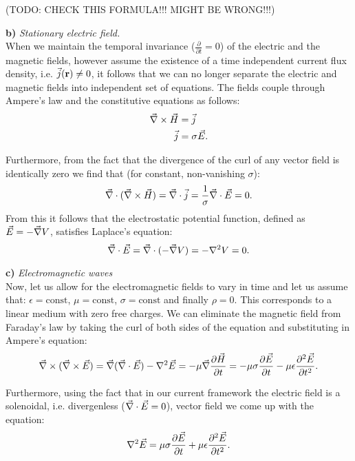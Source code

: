 \documentclass[10pt,a4paper]{report}
\def\Nabla{\ensuremath\vec{\nabla}}
\def\bm{\ensuremath\mathbf}
\def\curl{\ensuremath\Nabla\times}
\def\div{\ensuremath\Nabla\cdot}
\def\lap{\ensuremath\nabla^2}
\def\vlap{\ensuremath\nabla^2}
\begin{document}
(TODO: CHECK THIS FORMULA!!! MIGHT BE WRONG!!!)


\textbf{b)} \emph{Stationary electric field.} \\

When we maintain the temporal invariance ($\frac{\partial}{\partial t}=0$) of the electric and the magnetic fields, however assume the existence of a time independent current flux density, i.e. $\vec{j}(\bm{r}) \neq 0 $, it follows that we can no longer separate the electric and magnetic fields into independent set of equations. The fields couple through Ampere's law and the constitutive equations as follows:
\begin{align*}
  \curl \vec{H} &= \vec{j}\\
  \vec{j} &= \sigma \vec{E}. 
\end{align*}

Furthermore, from the fact that the divergence of the curl of any vector field is identically zero we find that (for constant, non-vanishing $\sigma$): 
\begin{equation*}
  \div (\curl \vec{H}) = \div \vec{j} = \frac{1}{\sigma}\div \vec{E} = 0. 
\end{equation*}
From this it follows that the electrostatic potential function, defined as $\vec{E}=-\Nabla V$, satisfies Laplace's equation:
\begin{equation*}
  \div \vec{E} = \div (-\Nabla V) = -\lap V = 0. 
\end{equation*}



\textbf{c)} \emph{Electromagnetic waves} \\
Now, let us allow for the electromagnetic fields to vary in time and let us assume that: $\epsilon = \text{const}$, $\mu = \text{const}$, $\sigma = \text{const}$ and finally $\rho = 0$. This corresponds to a linear
medium with zero free charges. We can eliminate the magnetic field from Faraday's law by taking the curl of both sides of the equation and substituting in Ampere's equation:
\begin{equation*}
  \curl (\curl \vec{E}) = \Nabla(\div \vec{E})-\vlap \vec{E} = -\mu \Nabla \frac{\partial \vec{H}}{\partial t} = -\mu\sigma\frac{\partial \vec{E}}{\partial t}-\mu\epsilon \frac{\partial^2 \vec{E}}{\partial t^2}.
\end{equation*} 

Furthermore, using the fact that in our current framework the electric field is a solenoidal, i.e. divergenless ($\div \vec{E} = 0 $), vector field we come up with the equation: 
\begin{equation}
  \label{eq:electricwavebase}
  \vlap\vec{E} =  \mu\sigma\frac{\partial \vec{E}}{\partial t}+\mu\epsilon \frac{\partial^2 \vec{E}}{\partial t^2}.
\end{equation}
\end{document}
